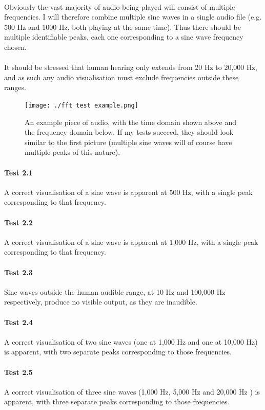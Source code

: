 \paragraph{}
Obviously the vast majority of audio being played will consist of multiple frequencies. I will therefore combine multiple sine waves in a single audio file (e.g. 500 Hz and 1000 Hz, both playing at the same time). Thus there should be multiple identifiable peaks, each one corresponding to a sine wave frequency chosen.

\paragraph{}
It should be stressed that human hearing only extends from 20 Hz to 20,000 Hz, and as such any audio visualisation must exclude frequencies outside these ranges.

\begin{figure}[H]
	\texttt{[image: ./fft test example.png]}
	\caption{An example piece of audio, with the time domain shown above and the frequency domain below. If my tests succeed, they should look similar to the first picture (multiple sine waves will of course have multiple peaks of this nature). }
\end{figure}

\begin{multicols}{2}
\paragraph{Test 2.1} A correct visualisation of a sine wave is apparent at 500 Hz, with a single peak corresponding to that frequency.
\paragraph{Test 2.2} A correct visualisation of a sine wave is apparent at 1,000 Hz, with a single peak corresponding to that frequency.
\paragraph{Test 2.3} Sine waves outside the human audible range, at 10 Hz and 100,000 Hz respectively, produce no visible output, as they are inaudible.
\paragraph{Test 2.4} A correct visualisation of two sine waves (one at 1,000 Hz and one at 10,000 Hz) is apparent, with two separate peaks corresponding to those frequencies.
\paragraph{Test 2.5} A correct visualisation of three sine waves (1,000 Hz, 5,000 Hz and 20,000 Hz ) is apparent, with three separate peaks corresponding to those frequencies.
\end{multicols}


